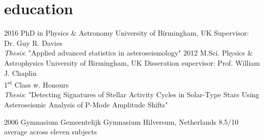 \documentclass[]{k-cv} %
\begin{document}
\clearpage
{}


\section{education}

\begin{entrylist}
\centry
{2016 }
{PhD {\normalfont in Physics \& Astronomy}}
{University of Birmingham, UK}
{Supervisor: Dr. Guy R. Davies\\
\textit{Thesis}: "Applied advanced statistics in asteroseismology"} 
\centry
{2012 }
{M.Sci. {\normalfont Physics \& Astrophysics}}
{University of Birmingham, UK}
{Disseration supervisor: Prof. William J. Chaplin\\
1\textsuperscript{st} Class w. Honours\\ \textit{Thesis}: "Detecting Signatures of Stellar Activity Cycles in Solar-Type Stars Using Asteroseismic Analysis of P-Mode Amplitude Shifts"}



\centry
{2006 }
{Gymnasium}
{Gemeentelijk Gymnasium Hilversum, Netherlands}
{8.5/10 average across eleven subjects}
\end{entrylist}
\end{document}
